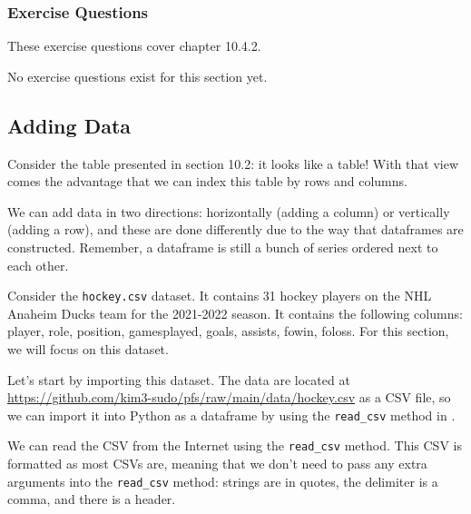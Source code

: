 \subsubsection*{Exercise Questions}
These exercise questions cover chapter 10.4.2.

No exercise questions exist for this section yet.

\subsection{Adding Data}
Consider the table presented in section 10.2: it looks like a table! With that view comes the advantage that we can index this table by rows and columns.\par
{}
We can add data in two directions: horizontally (adding a column) or vertically (adding a row), and these are done differently due to the way that dataframes are constructed. Remember, a  dataframe is still a bunch of  series ordered next to each other.\par
Consider the \verb|hockey.csv| dataset. It contains 31 hockey players on the NHL Anaheim Ducks team for the 2021-2022 season. It contains the following columns: player, role, position, gamesplayed, goals, assists, fowin, foloss. For this section, we will focus on this dataset.\par
Let's start by importing this dataset. The data are located at\\ \href{https://github.com/kim3-sudo/pfs/raw/main/data/hockey.csv}{https://github.com/kim3-sudo/pfs/raw/main/data/hockey.csv} as a CSV file, so we can import it into Python as a  dataframe by using the \verb|read_csv| method in .\par
{}
We can read the CSV from the Internet using the \verb|read_csv| method. This CSV is formatted as most CSVs are, meaning that we don't need to pass any extra arguments into the \verb|read_csv| method: strings are in quotes, the delimiter is a comma, and there is a header.
